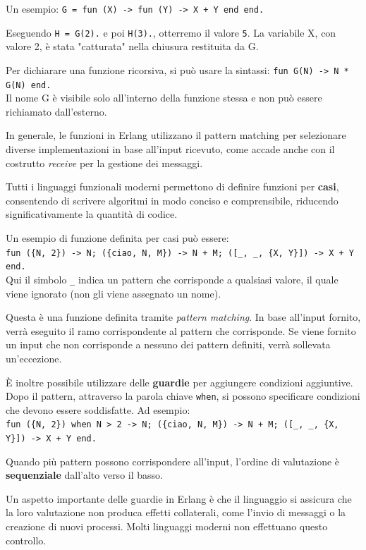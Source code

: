 \documentclass{article}
\begin{document}
Un esempio: \texttt{G = fun (X) -> fun (Y) -> X + Y end end.}

Eseguendo \texttt{H = G(2).} e poi \texttt{H(3).}, otterremo il valore \texttt{5}. La variabile X, con valore 2, è stata "catturata" nella chiusura restituita da G.

Per dichiarare una funzione ricorsiva, si può usare la sintassi: \texttt{fun G(N) -> N * G(N) end.}\\
Il nome G è visibile solo all'interno della funzione stessa e non può essere richiamato dall'esterno.

In generale, le funzioni in Erlang utilizzano il pattern matching per selezionare diverse implementazioni in base all'input ricevuto, come accade anche con il costrutto \textit{receive} per la gestione dei messaggi.

Tutti i linguaggi funzionali moderni permettono di definire funzioni per \textbf{casi}, consentendo di scrivere algoritmi in modo conciso e comprensibile, riducendo significativamente la quantità di codice.

Un esempio di funzione definita per casi può essere:\\
\texttt{fun (\{N, 2\}) -> N; (\{ciao, N, M\}) -> N + M; ([\_, \_, \{X, Y\}]) -> X + Y end.}\\
Qui il simbolo \texttt{\_} indica un pattern che corrisponde a qualsiasi valore, il quale viene ignorato (non gli viene assegnato un nome).

Questa è una funzione definita tramite \textit{pattern matching}. In base all'input fornito, verrà eseguito il ramo corrispondente al pattern che corrisponde. Se viene fornito un input che non corrisponde a nessuno dei pattern definiti, verrà sollevata un'eccezione.

È inoltre possibile utilizzare delle \textbf{guardie} per aggiungere condizioni aggiuntive. Dopo il pattern, attraverso la parola chiave \texttt{when}, si possono specificare condizioni che devono essere soddisfatte. Ad esempio:\\
\texttt{fun (\{N, 2\}) when N > 2 -> N; (\{ciao, N, M\}) -> N + M; ([\_, \_, \{X, Y\}]) -> X + Y end.}

Quando più pattern possono corrispondere all'input, l'ordine di valutazione è \textbf{sequenziale} dall'alto verso il basso.

Un aspetto importante delle guardie in Erlang è che il linguaggio si assicura che la loro valutazione non produca effetti collaterali, come l'invio di messaggi o la creazione di nuovi processi. Molti linguaggi moderni non effettuano questo controllo.
\end{document}
